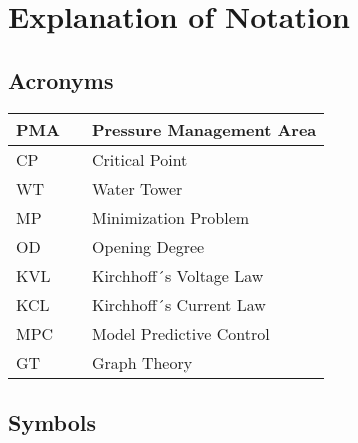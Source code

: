 \chapter{Explanation of Notation}

\section*{Acronyms}
	
	\begin{tabular}{|l c l|} \hline
		PMA 		&&	Pressure Management Area		\\ \hline
		CP			&&	Critical Point					\\ \hline
		WT			&&	Water Tower						\\ \hline
		MP		  	&&	Minimization Problem			\\ \hline
		OD 			&&  Opening Degree					\\ \hline
		KVL 		&&  Kirchhoff´s Voltage Law 		\\ \hline
		KCL 		&&  Kirchhoff´s Current Law			\\ \hline
		MPC			&&  Model Predictive Control		\\ \hline
		GT			&&  Graph Theory					\\ \hline
	\end{tabular}

\section*{Symbols}


